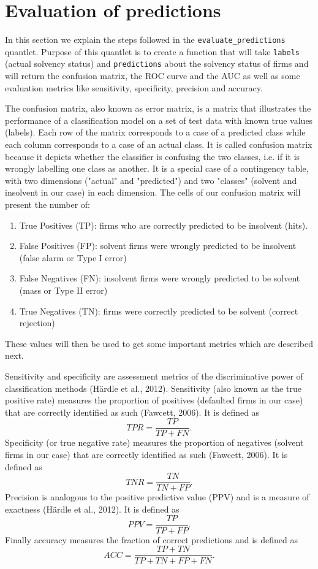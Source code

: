 \documentclass{article}
\begin{document}
\section{Evaluation of predictions}

In this section we explain the steps followed in the \texttt{evaluate\_predictions} quantlet. Purpose of this quantlet is to create a function that will take \texttt{labels} (actual solvency status) and \texttt{predictions} about the solvency status of firms and will return the confusion matrix, the ROC curve and the AUC as well as some evaluation metrics like sensitivity, specificity, precision and accuracy.

The confusion matrix, also known as error matrix, is a matrix that illustrates the performance of a classification model on a set of test data with known true values (labels). Each row of the matrix corresponds to a case of a predicted class while each column corresponds to a case of an actual class. It is called confusion matrix because it depicts whether the classifier is confusing the two classes, i.e. if it is wrongly labelling one class as another. It is a special case of a contingency table, with two dimensions ("actual" and "predicted") and two "classes" (solvent and insolvent in our case) in each dimension. The cells of our confusion matrix will present the number of:

\begin{enumerate}
\item True Positives (TP): firms who are correctly predicted to be insolvent (hits).
\item False Positives (FP): solvent firms were wrongly predicted to be insolvent (false alarm or Type I error)
\item False Negatives (FN): insolvent firms were wrongly predicted to be solvent (mass or Type II error)
\item True Negatives (TN): firms were correctly predicted to be solvent (correct rejection) 
\end{enumerate}

These values will then be used to get some important metrics which are described next.

Sensitivity and specificity are assessment metrics of the discriminative power of classification methods (H{\"a}rdle et al., 2012). Sensitivity (also known as the true positive rate) measures the proportion of positives (defaulted firms in our case) that are correctly identified as such (Fawcett, 2006). It is defined as $$TPR=\frac{TP}{TP+FN}.$$ Specificity (or true negative rate) measures the proportion of negatives (solvent firms in our case) that are correctly identified as such (Fawcett, 2006). It is defined as $$TNR=\frac{TN}{TN+FP}.$$ Precision is analogous to the positive predictive value (PPV) and is a measure of exactness (H{\"a}rdle et al., 2012). It is defined as $$PPV=\frac{TP}{TP+FP}.$$ Finally accuracy measures the fraction of correct predictions and is defined as $$ACC = \frac{TP+TN}{TP+TN+FP+FN}.$$
\end{document}
